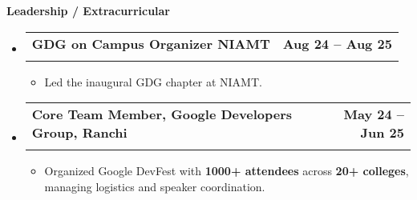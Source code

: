 \documentclass[letterpaper,11pt]{article}
\makeatletter
\newcommand{\resumeItem}[1]{
  \item\small{
    {#1 \vspace{-2pt}}
  }
}
\newcommand{\resumeSubheading}[4]{
  \vspace{-2pt}\item
    \begin{tabular*}{1.0\textwidth}[t]{l@{\extracolsep{\fill}}r}
      \textbf{#1} & \textbf{\small #2} \\
      \textit{\small#3} & \textit{\small #4} \\
    \end{tabular*}\vspace{-7pt}
}
\newcommand{\resumeSubHeadingListStart}{\begin{itemize}[leftmargin=0.0in, label={}]}
\newcommand{\resumeSubHeadingListEnd}{\end{itemize}}
\newcommand{\resumeItemListStart}{\begin{itemize}}
\newcommand{\resumeItemListEnd}{\end{itemize}\vspace{-5pt}}
\makeatother
\begin{document}
\begin{tcolorbox}\textbf{Leadership / Extracurricular}\end{tcolorbox}
\vspace{-10pt}
\resumeSubHeadingListStart
    \resumeSubheading
      {\small GDG on Campus Organizer NIAMT}{\small Aug 24 -- Aug 25}
      {}{}
      \vspace{-14pt}
      \resumeItemListStart
        \resumeItem{\small Led the inaugural GDG chapter at NIAMT.}
      \resumeItemListEnd
      \vspace{3pt}
    \resumeSubheading
      {\small Core Team Member, Google Developers Group, Ranchi}{\small May 24 -- Jun 25}
      {}{}
      \vspace{-14pt}
      \resumeItemListStart
        \resumeItem{\small Organized Google DevFest with \textbf{1000+ attendees} across \textbf{20+ colleges}, managing logistics and speaker coordination.}
      \resumeItemListEnd
\resumeSubHeadingListEnd
\end{document}
